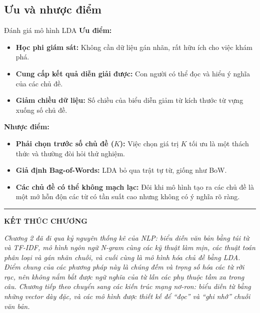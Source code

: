 \subsection{Ưu và nhược điểm}
\begin{assess}{Đánh giá mô hình LDA}
\textbf{Ưu điểm:}
\begin{itemize}
    \item \textbf{Học phi giám sát:} Không cần dữ liệu gán nhãn, rất hữu ích cho việc khám phá.
    \item \textbf{Cung cấp kết quả diễn giải được:} Con người có thể đọc và hiểu ý nghĩa của các chủ đề.
    \item \textbf{Giảm chiều dữ liệu:} Số chiều của biểu diễn giảm từ kích thước từ vựng xuống số chủ đề.
\end{itemize}
\textbf{Nhược điểm:}
\begin{itemize}
    \item \textbf{Phải chọn trước số chủ đề ($K$):} Việc chọn giá trị $K$ tối ưu là một thách thức và thường đòi hỏi thử nghiệm.
    \item \textbf{Giả định Bag-of-Words:} LDA bỏ qua trật tự từ, giống như BoW.
    \item \textbf{Các chủ đề có thể không mạch lạc:} Đôi khi mô hình tạo ra các chủ đề là một mớ hỗn độn các từ có tần suất cao nhưng không có ý nghĩa rõ ràng.
\end{itemize}
\end{assess}

\bigskip
\hrule
\bigskip

\begin{center}
    \textbf{\Large KẾT THÚC CHƯƠNG \thechapter}
\end{center}

\textit{Chương 2 đã đi qua kỷ nguyên thống kê của NLP: biểu diễn văn bản bằng túi từ và TF-IDF, mô hình ngôn ngữ N-gram cùng các kỹ thuật làm mịn, các thuật toán phân loại và gán nhãn chuỗi, và cuối cùng là mô hình hóa chủ đề bằng LDA. Điểm chung của các phương pháp này là chúng đếm và trọng số hóa các từ rời rạc, nên không nắm bắt được ngữ nghĩa của từ lẫn các phụ thuộc tầm xa trong câu. Chương tiếp theo chuyển sang các kiến trúc mạng nơ-ron: biểu diễn từ bằng những vector dày đặc, và các mô hình được thiết kế để “đọc” và “ghi nhớ” chuỗi văn bản.}